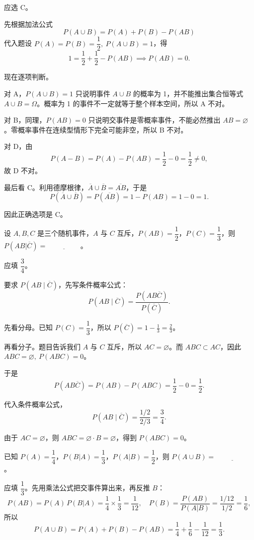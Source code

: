 ﻿\documentclass[lang=cn,11pt]{elegantbook}
\begin{document}
\begin{solution}
应选 C。

先根据加法公式
\[
P(A\cup B)=P(A)+P(B)-P(AB)
\]
代入题设 \(P(A)=P(B)=\dfrac12,\ P(A\cup B)=1\)，得
\[
1=\frac12+\frac12-P(AB)\implies P(AB)=0.
\]

现在逐项判断。

对 A，\(P(A\cup B)=1\) 只说明事件 \(A\cup B\) 的概率为 1，并不能推出集合恒等式 \(A\cup B=\Omega\)。概率为 1 的事件不一定就等于整个样本空间，所以 A 不对。

对 B，同理，\(P(AB)=0\) 只说明交事件是零概率事件，不能必然推出 \(AB=\varnothing\)。零概率事件在连续型情形下完全可能非空，所以 B 不对。

对 D，由
\[
P(A-B)=P(A)-P(AB)=\frac12-0=\frac12\neq 0,
\]
故 D 不对。

最后看 C。利用德摩根律，\(\overline{A}\cup\overline{B}=\overline{AB}\)，于是
\[
P(\overline{A}\cup\overline{B})=P(\overline{AB})=1-P(AB)=1-0=1.
\]

因此正确选项是 C。
\end{solution}

\begin{exercise}\label{exer:1-11}
设 \(A, B, C\) 是三个随机事件，\(A\) 与 \(C\) 互斥，\(P(AB)=\dfrac{1}{2}\)，\(P(C)=\dfrac{1}{3}\)，则 \(P(AB|\overline{C})=\underline{\hspace{2cm}}\)。
\end{exercise}

\begin{solution}
应填 \(\dfrac34\)。

要求 \(P(AB\mid \overline C)\)，先写条件概率公式：
\[
P(AB\mid \overline C)=\frac{P(AB\overline C)}{P(\overline C)}.
\]

先看分母。已知 \(P(C)=\dfrac13\)，所以 \(P(\overline C)=1-\frac13=\frac23\)。

再看分子。题目告诉我们 \(A\) 与 \(C\) 互斥，所以 \(AC=\varnothing\)。而 \(ABC\subset AC\)，因此 \(ABC=\varnothing,\ P(ABC)=0\)。

于是
\[
P(AB\overline C)=P(AB)-P(ABC)=\frac12-0=\frac12.
\]

代入条件概率公式，
\[
P(AB\mid \overline C)=\frac{1/2}{2/3}=\frac34.
\]
\end{solution}

\begin{note}
由于 \(AC = \varnothing\)，则 \(ABC = \varnothing \cdot B = \varnothing\)，得到 \(P(ABC)=0\)。
\end{note}

\begin{exercise}\label{exer:1-12}
已知 \(P(A)=\dfrac{1}{4}\)，\(P(B|A)=\dfrac{1}{3}\)，\(P(A|B)=\dfrac{1}{2}\)，则 \(P(A \cup B)=\underline{\hspace{2cm}}\)。
\end{exercise}
\begin{solution}
应填 \(\dfrac{1}{3}\)。先用乘法公式把交事件算出来，再反推 \(B\)：
\[
P(AB) = P(A)\,P(B|A) = \frac{1}{4} \times \frac{1}{3} = \frac{1}{12}, \quad P(B) = \frac{P(AB)}{P(A|B)} = \frac{1/12}{1/2} = \frac{1}{6},
\]
所以
\[
P(A \cup B) = P(A) + P(B) - P(AB) = \frac{1}{4} + \frac{1}{6} - \frac{1}{12} = \frac{1}{3}.
\]
\end{solution}
\end{document}
